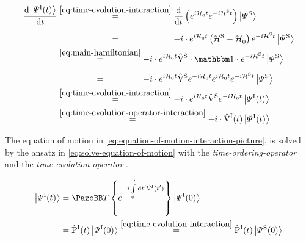 \begin{equation}
    \label{eq:equation-of-motion-interaction-picture}
    \begin{split}
        \difft{\ketpsiof[\interactionPicture]{t}} &\stackrel{\ref{eq:time-evolution-interaction}}{=}
        \difft{} \left(e^{i \HzeroHamiltonian{} t} e^{-i \pictureHamiltonian[\schroedingerPicture]{} t} \right)\ketpsi[\schroedingerPicture]{} \\
        &\stackrel{\phantom{\ref{eq:time-evolution-interaction}}}{=} -i \cdot e^{i \HzeroHamiltonian{} t}\left( \pictureHamiltonian[\schroedingerPicture]{} - \HzeroHamiltonian{} \right) e^{-i \pictureHamiltonian[\schroedingerPicture]{} t} \ketpsi[\schroedingerPicture]{}\\
        &\stackrel{\ref{eq:main-hamiltonian}}{=} -i \cdot e^{i \HzeroHamiltonian{} t} \Vhamiltonian[\schroedingerPicture] \cdot \one \cdot e^{-i \pictureHamiltonian[\schroedingerPicture]{} t} \ketpsi[\schroedingerPicture]{}\\
        &\stackrel{\phantom{\ref{eq:main-hamiltonian}}}{=} -i \cdot e^{i \HzeroHamiltonian{} t} \Vhamiltonian[\schroedingerPicture] e^{-i \HzeroHamiltonian{} t}e^{i \HzeroHamiltonian{} t} e^{-i \pictureHamiltonian[\schroedingerPicture]{} t} \ketpsi[\schroedingerPicture]{}\\
        &\stackrel{\ref{eq:time-evolution-interaction}}{=} -i \cdot e^{i \HzeroHamiltonian{} t} \Vhamiltonian[\schroedingerPicture] e^{-i \HzeroHamiltonian{} t}\ketpsiof[\interactionPicture]{t}\\
        &\stackrel{\ref{eq:time-evolution-operator-interaction}}{=} -i \cdot \VhamiltonianOfT[\interactionPicture] \ketpsiof[\interactionPicture]{t}
    \end{split}
\end{equation}

The equation of motion in \autoref{eq:equation-of-motion-interaction-picture}, is solved by the ansatz in \autoref{eq:solve-equation-of-motion} with the  \emph{time-ordering-operator} \timeOrderingOperator and the \emph{time-evolution-operator} \timeEvolutionOperator[\interactionPicture].

\begin{equation}
    \label{eq:solve-equation-of-motion}
    \begin{split}
        \ketpsiof[\interactionPicture]{t} &= \timeOrderingOperator \left\lbrace e^{-i\int\limits_0^t \text{d} t' \VhamiltonianOf[\interactionPicture]{t'}}\right\rbrace \ketpsiof[\interactionPicture]{0}\\
        &= \timeEvolutionOperator[\interactionPicture] \ketpsiof[\interactionPicture]{0} \stackrel{\ref{eq:time-evolution-interaction}}{=} \timeEvolutionOperator[\interactionPicture] \ketpsiof[\schroedingerPicture]{0}
    \end{split}
\end{equation}

